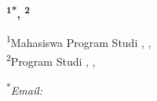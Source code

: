\documentclass[a4paper, 12pt]{article}
\begin{document}
    
    \pagestyle{fancy}
    
    \begin{center}
        \textbf{\large\judul}
        
        \textbf{\namaMahasiswa\textsuperscript{1*}, \namaDosen\textsuperscript{2}}
        
        \textsuperscript{1}Mahasiswa Program Studi \programStudi, \fakultas, \perguruanTinggi
        \\
        \textsuperscript{2}Program Studi \programStudiDosen, \fakultasDosen, \perguruanTinggiDosen
        
        \textsuperscript{*}\textit{Email: \href{mailto:\emailMahasiswa}{\emailMahasiswa}}
        
%       
%        

%        
%        
    \end{center}
    
    
    
    \onehalfspacing %
    
    
    
    
    
    
    \nocite{*}
    
    
\end{document}
